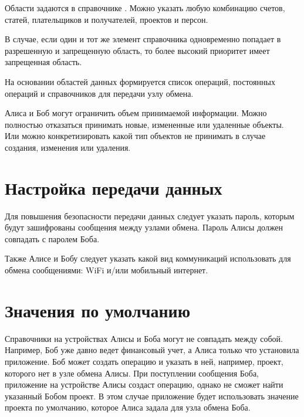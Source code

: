 \documentclass[a4paper,10pt,russian]{sphinxmanual}
\begin{document}
\sphinxAtStartPar
Области задаются в справочнике . Можно указать любую комбинацию счетов, статей, плательщиков и получателей,
проектов и персон.

\sphinxAtStartPar
В случае, если один и тот же элемент справочника одновременно попадает в разрешенную и запрещенную область, то более
высокий приоритет имеет запрещенная область.

\sphinxAtStartPar
На основании областей данных формируется список операций, постоянных операций и справочников для передачи узлу обмена.

\sphinxAtStartPar
Алиса и Боб могут ограничить объем принимаемой информации. Можно полностью отказаться принимать новые, измененные или удаленные объекты.
Или можно конкретизировать какой тип объектов не принимать в случае создания, изменения или удаления.


\section{Настройка передачи данных}
\label{\detokenize{teamwork:id9}}
\sphinxAtStartPar
Для повышения безопасности передачи данных следует указать пароль, которым будут зашифрованы сообщения между узлами обмена. Пароль Алисы должен совпадать с паролем Боба.

\sphinxAtStartPar
Также Алисе и Бобу следует указать какой вид коммуникаций использовать для обмена сообщениями: Wi\sphinxhyphen{}Fi и/или мобильный интернет.


\section{Значения по умолчанию}
\label{\detokenize{teamwork:id10}}
\sphinxAtStartPar
Справочники на устройствах Алисы и Боба могут не совпадать между собой. Например, Боб уже давно
ведет финансовый учет, а Алиса только что установила приложение. Боб может создать операцию и указать в ней, например,
проект, которого нет в узле обмена Алисы. При поступлении сообщения Боба, приложение на устройстве Алисы
создаст операцию, однако не сможет найти указанный Бобом проект. В этом случае приложение будет использовать
значение проекта по умолчанию, которое Алиса задала для узла обмена Боба.
\end{document}
